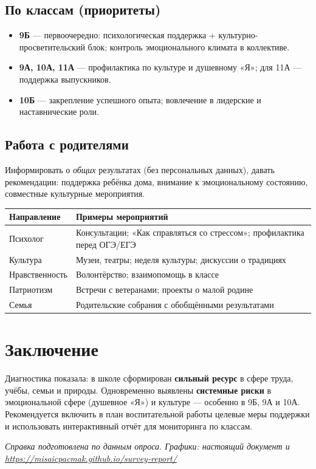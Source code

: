 \documentclass[12pt,a4paper]{article}
\begin{document}
\subsection{По классам (приоритеты)}

\begin{itemize}
    \item \textbf{9Б} --- первоочередно: психологическая поддержка + культурно-просветительский блок; контроль эмоционального климата в коллективе.
    \item \textbf{9А, 10А, 11А} --- профилактика по культуре и душевному «Я»; для 11А --- поддержка выпускников.
    \item \textbf{10Б} --- закрепление успешного опыта; вовлечение в лидерские и наставнические роли.
\end{itemize}

\subsection{Работа с родителями}

Информировать о \textit{общих} результатах (без персональных данных), давать рекомендации: поддержка ребёнка дома, внимание к эмоциональному состоянию, совместные культурные мероприятия.

\small
\begin{longtable}{@{}p{3.8cm}p{10.5cm}@{}}
\toprule
\textbf{Направление} & \textbf{Примеры мероприятий} \\
\midrule
\endhead
Психолог & Консультации; «Как справляться со стрессом»; профилактика перед ОГЭ/ЕГЭ \\
Культура & Музеи, театры; неделя культуры; дискуссии о традициях \\
Нравственность & Волонтёрство; взаимопомощь в классе \\
Патриотизм & Встречи с ветеранами; проекты о малой родине \\
Семья & Родительские собрания с обобщёнными результатами \\
\bottomrule
\end{longtable}
\normalsize

\section{Заключение}

Диагностика показала: в школе сформирован \textbf{сильный ресурс} в сфере труда, учёбы, семьи и природы. Одновременно выявлены \textbf{системные риски} в эмоциональной сфере (душевное «Я») и культуре --- особенно в 9Б, 9А и 10А. Рекомендуется включить в план воспитательной работы целевые меры поддержки и использовать интерактивный отчёт для мониторинга по классам.

\vspace{1em}
\noindent\small\textit{Справка подготовлена по данным опроса. Графики: настоящий документ и \url{https://misaicpacmak.github.io/survey-report/}}
\end{document}
